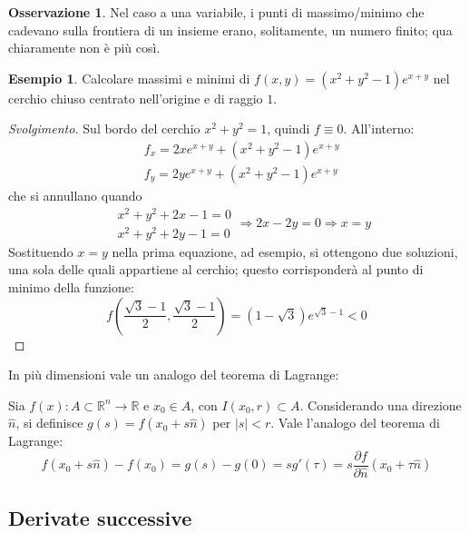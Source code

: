 \documentclass[10pt, a4paper]{scrartcl}
\newenvironment{svolgimento}{\renewcommand\qedsymbol{$\blacksquare$}\begin{proof}[Svolgimento]}{\end{proof}}
\theoremstyle{definition}
\newtheorem{esempio}{Esempio}
\numberwithin{esempio}{section}
\theoremstyle{definition}
\newtheorem{obs}{Osservazione}
\numberwithin{obs}{section}
\numberwithin{nota}{section}
\numberwithin{equation}{subsection}
\begin{document}
\begin{obs}
	Nel caso a una variabile, i punti di massimo/minimo che cadevano sulla frontiera di un insieme erano, solitamente, un numero finito; qua chiaramente non \`e pi\`u cos\`i.
\end{obs}
\begin{esempio}
	Calcolare massimi e minimi di $f(x,y) = (x^2 + y^2 - 1)e^{x+y} $ nel cerchio chiuso centrato nell'origine e di raggio $1$.
	\begin{svolgimento}
		Sul bordo del cerchio $x^2 + y^2 = 1$, quindi $f\equiv 0$. All'interno:
		\[
			\begin{split}
				&f_x = 2x e^{x+y}  + (x^2 + y^2 -1)e^{x+y} \\
				&f_y = 2y e^{x+y} + (x^2 + y^2 - 1) e^{x+y} 
			\end{split}
		\] 
	che si annullano quando 
	\[
	\begin{split}
		&x^2 + y^2 + 2x - 1 = 0\\
		&x^2 + y^2 + 2y - 1 = 0
	\end{split}\Rightarrow 2x - 2y = 0 \Rightarrow x=y
	\] 
Sostituendo $x=y$ nella prima equazione, ad esempio, si ottengono due soluzioni, una sola delle quali appartiene al cerchio; questo corrisponder\`a al punto di minimo della funzione:
\[
f\left(\frac{\sqrt{3} -1}{2}, \frac{\sqrt{3} -1}{2}\right) = (1-\sqrt{3} ) e^{\sqrt{3} -1}  < 0
\] 
\end{svolgimento}
\end{esempio}
\noindent In pi\`u dimensioni vale un analogo del teorema di Lagrange:
\begin{teorema}
	{}{}
	Sia $f(x) : A \subset \mathbb{R}^n \to \mathbb{R}$ e $x_0 \in A$, con $I(x_0,r) \subset A$. Considerando una direzione $\hat{n}$, si definisce $g(s) = f(x_0+ s \hat{n})$ per $\lvert s \rvert <r$. Vale l'analogo del teorema di Lagrange:
	\begin{equation}
		f(x_0+s\hat{n}) - f(x_0) = g(s) - g(0) = s g'(\tau ) = s \frac{\partial f}{\partial \hat{n}} (x_0 + \tau \hat{n})
	\end{equation}
\end{teorema}

\subsection{Derivate successive}
\end{document}
